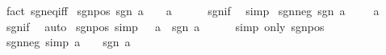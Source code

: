 \begin{isabellebody}
\isamarkupfalse%
\ {\isacharparenleft}{\kern0pt}fact\ sgn{\isacharunderscore}{\kern0pt}eq{\isacharunderscore}{\kern0pt}{}{\isacharunderscore}{\kern0pt}iff{\isacharparenright}{\kern0pt}%
\endisatagproof
{\isafoldproof}%
%
\isadelimproof
\isanewline
%
\endisadelimproof
\isanewline
{}\isamarkupfalse%
\ sgn{\isacharunderscore}{\kern0pt}{}{\isacharunderscore}{\kern0pt}pos{\isacharcolon}{\kern0pt}\ {\isachardoublequoteopen}sgn\ a\ {\isacharequal}{\kern0pt}\ {}\ {\isasymlongleftrightarrow}\ a\ {\isachargreater}{\kern0pt}\ {}{\isachardoublequoteclose}\isanewline
%
\isadelimproof
\ \ %
\endisadelimproof
%
\isatagproof
{}\isamarkupfalse%
\ sgn{\isacharunderscore}{\kern0pt}if\ \isamarkupfalse%
\ simp%
\endisatagproof
{\isafoldproof}%
%
\isadelimproof
\isanewline
%
\endisadelimproof
\isanewline
{}\isamarkupfalse%
\ sgn{\isacharunderscore}{\kern0pt}{}{\isacharunderscore}{\kern0pt}neg{\isacharcolon}{\kern0pt}\ {\isachardoublequoteopen}sgn\ a\ {\isacharequal}{\kern0pt}\ {\isacharminus}{\kern0pt}\ {}\ {\isasymlongleftrightarrow}\ a\ {\isacharless}{\kern0pt}\ {}{\isachardoublequoteclose}\isanewline
%
\isadelimproof
\ \ %
\endisadelimproof
%
\isatagproof
{}\isamarkupfalse%
\ sgn{\isacharunderscore}{\kern0pt}if\ \isamarkupfalse%
\ auto%
\endisatagproof
{\isafoldproof}%
%
\isadelimproof
\isanewline
%
\endisadelimproof
\isanewline
{}\isamarkupfalse%
\ sgn{\isacharunderscore}{\kern0pt}pos\ {\isacharbrackleft}{\kern0pt}simp{\isacharbrackright}{\kern0pt}{\isacharcolon}{\kern0pt}\ {\isachardoublequoteopen}{}\ {\isacharless}{\kern0pt}\ a\ {\isasymLongrightarrow}\ sgn\ a\ {\isacharequal}{\kern0pt}\ {}{\isachardoublequoteclose}\isanewline
%
\isadelimproof
\ \ %
\endisadelimproof
%
\isatagproof
{}\isamarkupfalse%
\ {\isacharparenleft}{\kern0pt}simp\ only{\isacharcolon}{\kern0pt}\ sgn{\isacharunderscore}{\kern0pt}{}{\isacharunderscore}{\kern0pt}pos{\isacharparenright}{\kern0pt}%
\endisatagproof
{\isafoldproof}%
%
\isadelimproof
\isanewline
%
\endisadelimproof
\isanewline
{}\isamarkupfalse%
\ sgn{\isacharunderscore}{\kern0pt}neg\ {\isacharbrackleft}{\kern0pt}simp{\isacharbrackright}{\kern0pt}{\isacharcolon}{\kern0pt}\ {\isachardoublequoteopen}a\ {\isacharless}{\kern0pt}\ {}\ {\isasymLongrightarrow}\ sgn\ a\ {\isacharequal}{\kern0pt}\ {\isacharminus}{\kern0pt}\ {}{\isachardoublequoteclose}\isanewline

\end{isabellebody}
